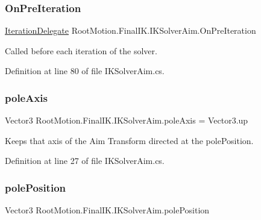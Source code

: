 \subsubsection{\texorpdfstring{On\+Pre\+Iteration}{OnPreIteration}}
{\footnotesize\ttfamily \mbox{\hyperlink{class_root_motion_1_1_final_i_k_1_1_i_k_solver_ae3da6a8ccd8224ce56d15c4da5cd1ef7}{Iteration\+Delegate}} Root\+Motion.\+Final\+I\+K.\+I\+K\+Solver\+Aim.\+On\+Pre\+Iteration}



Called before each iteration of the solver. 



Definition at line 80 of file I\+K\+Solver\+Aim.\+cs.

\mbox{\label{class_root_motion_1_1_final_i_k_1_1_i_k_solver_aim_a811b744d5627bd7dfcb69ae08a4c97d7}} 
\subsubsection{\texorpdfstring{pole\+Axis}{poleAxis}}
{\footnotesize\ttfamily Vector3 Root\+Motion.\+Final\+I\+K.\+I\+K\+Solver\+Aim.\+pole\+Axis = Vector3.\+up}



Keeps that axis of the Aim Transform directed at the pole\+Position. 



Definition at line 27 of file I\+K\+Solver\+Aim.\+cs.

\mbox{\label{class_root_motion_1_1_final_i_k_1_1_i_k_solver_aim_a5442b95ebced2ae6fe00b1deab40d424}} 
\subsubsection{\texorpdfstring{pole\+Position}{polePosition}}
{\footnotesize\ttfamily Vector3 Root\+Motion.\+Final\+I\+K.\+I\+K\+Solver\+Aim.\+pole\+Position}



